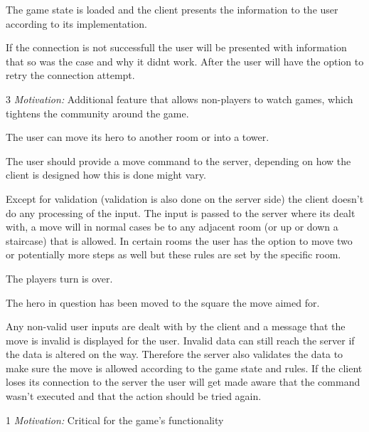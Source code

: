 The game state is loaded and the client presents the information to the user according to its implementation.

If the connection is not successfull the user will be presented with information that so was the case and why it didnt work. After the user will have the option to retry the connection attempt. 

3 \emph{Motivation:} Additional feature that allows non-players to watch games, which tightens the community around the game.

\stoprequirement



The user can move its hero to another room or into a tower.

The user should provide a move command to the server, depending on how the client is designed how this is done might vary.

Except for validation (validation is also done on the server side) the client doesn't do any processing of the input. The input is passed to the server where its dealt with, a move will in normal cases be to any adjacent room (or up or down a staircase) that is allowed. In certain rooms the user has the option to move two or potentially more steps as well but these rules are set by the specific room.

The players turn is over.

The hero in question has been moved to the square the move aimed for.

Any non-valid user inputs are dealt with by the client and a message that the move is invalid is displayed for the user.
Invalid data can still reach the server if the data is altered on the way. Therefore the server also validates the data to make sure the move is allowed according to the game state and rules.
If the client loses its connection to the server the user will get made aware that the command wasn't executed and that the action should be tried again.

1 \emph{Motivation:} Critical for the game's functionality

